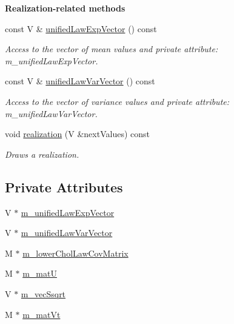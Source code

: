 \begin{Indent}{\bf Realization-\/related methods}\par
\begin{DoxyCompactItemize}
\item 
const V \& \hyperlink{class_q_u_e_s_o_1_1_log_normal_vector_realizer_aebcd637e11b05db4cd7501d5e448d500}{unified\-Law\-Exp\-Vector} () const 
\begin{DoxyCompactList}\small\item\em Access to the vector of mean values and private attribute\-: m\-\_\-unified\-Law\-Exp\-Vector. \end{DoxyCompactList}\item 
const V \& \hyperlink{class_q_u_e_s_o_1_1_log_normal_vector_realizer_a6674a97c519d647bcdb2523feafe149a}{unified\-Law\-Var\-Vector} () const 
\begin{DoxyCompactList}\small\item\em Access to the vector of variance values and private attribute\-: m\-\_\-unified\-Law\-Var\-Vector. \end{DoxyCompactList}\item 
void \hyperlink{class_q_u_e_s_o_1_1_log_normal_vector_realizer_a27d5cb6728ed1c78ba2ce6f1d1e5144a}{realization} (V \&next\-Values) const 
\begin{DoxyCompactList}\small\item\em Draws a realization. \end{DoxyCompactList}\end{DoxyCompactItemize}
\end{Indent}
\subsection*{Private Attributes}
\begin{DoxyCompactItemize}
\item 
V $\ast$ \hyperlink{class_q_u_e_s_o_1_1_log_normal_vector_realizer_a896a336c4baf517add5ba372e5120408}{m\-\_\-unified\-Law\-Exp\-Vector}
\item 
V $\ast$ \hyperlink{class_q_u_e_s_o_1_1_log_normal_vector_realizer_a418dbfe867eb80b53ebe3aeaf26d208c}{m\-\_\-unified\-Law\-Var\-Vector}
\item 
M $\ast$ \hyperlink{class_q_u_e_s_o_1_1_log_normal_vector_realizer_a9a0d52cb94a3de5aa367d4e66f4fa137}{m\-\_\-lower\-Chol\-Law\-Cov\-Matrix}
\item 
M $\ast$ \hyperlink{class_q_u_e_s_o_1_1_log_normal_vector_realizer_ac5d5aae6606895a42ab1c899bdb37906}{m\-\_\-mat\-U}
\item 
V $\ast$ \hyperlink{class_q_u_e_s_o_1_1_log_normal_vector_realizer_ad714ba417a345d76f32d9af389b4dccd}{m\-\_\-vec\-Ssqrt}
\item 
M $\ast$ \hyperlink{class_q_u_e_s_o_1_1_log_normal_vector_realizer_a7fcafdfed9d2ec7cc70b87109240754a}{m\-\_\-mat\-Vt}
\end{DoxyCompactItemize}

